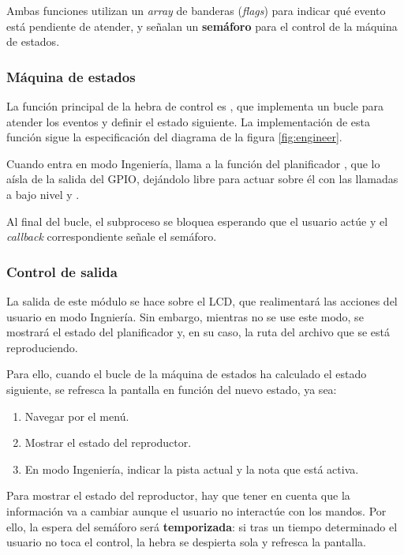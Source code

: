 Ambas funciones utilizan un \textit{array} de banderas (\textit{flags}) para indicar qué evento está pendiente de atender, y señalan un \textbf{semáforo} para el control de la máquina de estados.

\subsubsection{Máquina de estados}

La función principal de la hebra de control es , que implementa un bucle para atender los eventos y definir el estado siguiente. La implementación de esta función sigue la especificación del diagrama de la figura \ref{fig:engineer}.

Cuando entra en modo Ingeniería, llama a la función del planificador , que lo aísla de la salida del \acrshort{GPIO}, dejándolo libre para actuar sobre él con las llamadas a bajo nivel  y .

Al final del bucle, el subproceso se bloquea esperando que el usuario actúe y el \textit{callback} correspondiente señale el semáforo.

\subsubsection{Control de salida}

La salida de este módulo se hace sobre el \acrshort{LCD}, que realimentará las acciones del usuario en modo Ingniería. Sin embargo, mientras no se use este modo, se mostrará el estado del planificador y, en su caso, la ruta del archivo que se está reproduciendo.

Para ello, cuando el bucle de la máquina de estados ha calculado el estado siguiente, se refresca la pantalla en función del nuevo estado, ya sea:

\begin{enumerate}
	\item Navegar por el menú.
	\item Mostrar el estado del reproductor.
	\item En modo Ingeniería, indicar la pista actual y la nota que está activa.
\end{enumerate}

Para mostrar el estado del reproductor, hay que tener en cuenta que la información va a cambiar aunque el usuario no interactúe con los mandos. Por ello, la espera del semáforo será \textbf{temporizada}: si tras un tiempo determinado el usuario no toca el control, la hebra se despierta sola y refresca la pantalla.

